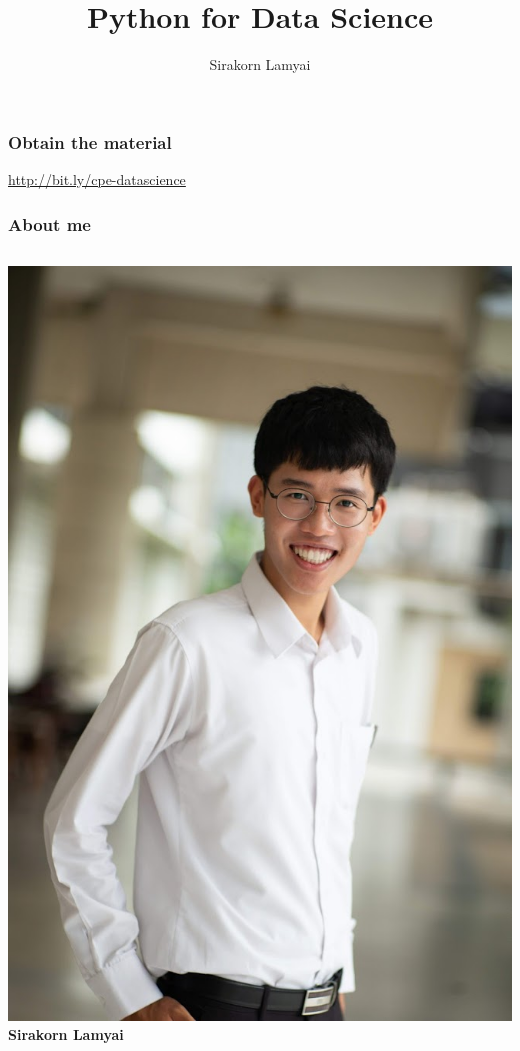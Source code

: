 \documentclass[aspectratio=169]{beamer}
\title{Python for Data Science}
\author{Sirakorn Lamyai}
\institute{Student, Kasetsart U.}
\begin{document}
\maketitle

\begin{frame}
    \frametitle{Obtain the material}
    \centering

    {\LARGE \url{http://bit.ly/cpe-datascience}}
\end{frame}
\begin{frame}
    \frametitle{About me}
    \begin{columns}
            \includegraphics[height=0.8\textheight]{images/sirakorn-1.jpeg}
            {\large \textbf{Sirakorn Lamyai}}

\end{columns}
\end{frame}
\end{document}
